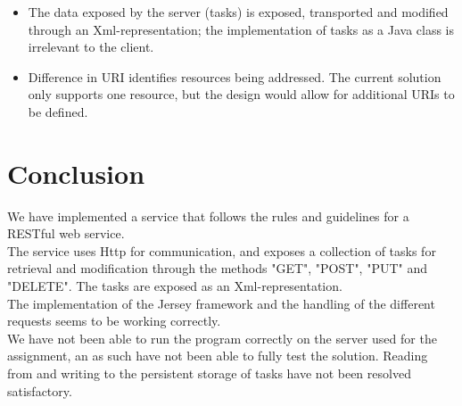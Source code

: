\begin{itemize}
\begin{itemize}
	\end{itemize}
	\item The data exposed by the server (tasks) is exposed, transported and modified through an Xml-representation; the implementation of tasks as a Java class is irrelevant to the client.
	\item Difference in URI identifies resources being addressed. The current solution only supports one resource, but the design would allow for additional URIs to be defined. 
\end{itemize}
	
\section{Conclusion}
\label{rest_conclusion}
We have implemented a service that follows the rules and guidelines for a RESTful web service.\\
The service uses Http for communication, and exposes a collection of tasks for retrieval and modification through the methods "GET", "POST", "PUT" and "DELETE". The tasks are exposed as an Xml-representation.\\
The implementation of the Jersey framework and the handling of the different requests seems to be working correctly.\\
We have not been able to run the program correctly on the server used for the assignment, an as such have not been able to fully test the solution. Reading from and writing to the persistent storage of tasks have not been resolved satisfactory. 